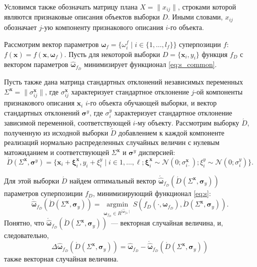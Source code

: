 \documentclass[12pt,a4paper]{article}
\theoremstyle{definition}
\begin{document}
Условимся также обозначать матрицу плана $X = \| x_{ij} \|$, строками которой
являются признаковые описания объектов выборки $D$. Иными словами, $x_{ij}$
обозначает $j$-ую компоненту признакового описания $i$-го объекта.

Рассмотрим вектор параметров
$\boldsymbol{\omega}_f = \{ \omega_i^f \mid i \in \{ 1, \dots, l_f \} \}$
суперпозиции $f$: $f(\mathbf{x}) = f(\mathbf{x}, \boldsymbol{\omega}_f)$.
Пусть для некоторой выборки $D = \{ \mathbf{x}_i, y_i \}$ функция $f_D$ с
вектором параметров $\hat{\boldsymbol{\omega}}_{f_D}$ минимизирует
функционал \eqref{eq:s_common}.

Пусть также дана матрица стандартных отклонений
независимых переменных $\Sigma^{\mathbf{x}} = \| \sigma^{\mathbf{x}}_{ij} \|$,
где $\sigma^{\mathbf{x}}_{ij}$ характеризует стандартное отклонение $j$-ой
компоненты признакового описания $\mathbf{x}_i$ $i$-го объекта обучающей выборки,
и вектор стандартных отклонений $\boldsymbol{\sigma}^y$, где $\sigma^y_i$
характеризует стандартное отклонение зависимой переменной, соответствующей
$i$-му объекту.
Рассмотрим выборку $\acute{D}$, полученную из исходной выборки $\tilde{D}$
добавлением к каждой компоненте реализаций нормально распределенных
случайных величин с нулевым матожиданием и соответствующей
$\Sigma^{\mathbf{x}}$ и $\boldsymbol{\sigma}^y$ дисперсией:
\begin{equation}
  \acute{D}(\Sigma^{\mathbf{x}}, \boldsymbol{\sigma}^y) = \{ \mathbf{x}_i + \boldsymbol{\xi}^{\mathbf{x}}_i, y_i + \xi^y_i \mid i \in 1, \dots, \ell; \boldsymbol{\xi}^{\mathbf{x}}_i \sim \mathcal{N}(0; \sigma^{\mathbf{x}}_{i \cdot}); \xi^y_i \sim \mathcal{N}(0; \sigma^y_i) \}.
  \label{eq:d_acute}
\end{equation}

Для этой выборки $\acute{D}$ найдем оптимальный вектор $\acute{\hat{\boldsymbol{\omega}}}_{f_D} (\acute{D} (\Sigma^{\mathbf{x}}, \boldsymbol{\sigma}_y))$
параметров суперпозиции $f_D$, минимизирующий функционал \eqref{eq:s}:
\begin{equation}
  \acute{\hat{\boldsymbol{\omega}}}_{f_D} (\acute{D} (\Sigma^{\mathbf{x}}, \boldsymbol{\sigma}_y)) = \mathop{\arg \min}\limits_{\boldsymbol{\omega}_{f_D} \in R^{\mid \hat{\boldsymbol{\omega}}_{f_D} \mid}} S (f_D (\cdot, \boldsymbol{\omega}_{f_D}), \acute{D} (\Sigma^{\mathbf{x}}, \boldsymbol{\sigma}_y)).
  \label{eq:hat_omega}
\end{equation}
Понятно, что $\acute{\hat{\boldsymbol{\omega}}}_{f_D} (\acute{D} (\Sigma^{\mathbf{x}}, \boldsymbol{\sigma}_y))$~---
векторная случайная величина, и, следовательно,
\[
  \Delta\hat{\boldsymbol{\omega}}_{f_D}(\acute{D} (\Sigma^{\mathbf{x}}, \boldsymbol{\sigma}_y) ) = \hat{\boldsymbol{\omega}}_{f_D} - \acute{\hat{\boldsymbol{\omega}}}_{f_D} (\acute{D} (\Sigma^{\mathbf{x}}, \boldsymbol{\sigma}_y))
\]
также векторная случайная величина.
\end{document}

